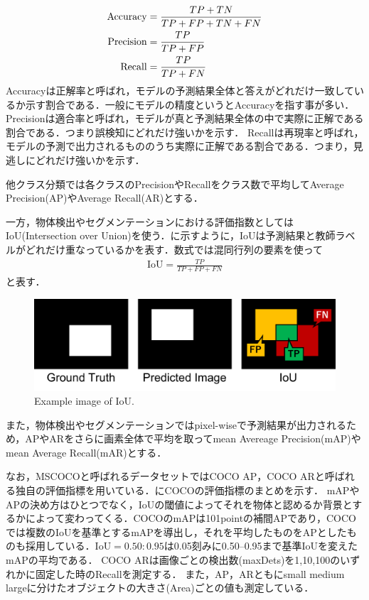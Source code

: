 \begin{align}\label{eq:精度}
    \mathrm{Accuracy} & = \frac{TP+TN}{TP+FP+TN+FN} \notag \\ 
    \mathrm{Precision} & = \frac{TP}{TP+FP} \\
    \mathrm{Recall} & = \frac{TP}{TP+FN} \notag
\end{align}
Accuracyは正解率と呼ばれ，モデルの予測結果全体と答えがどれだけ一致しているか示す割合である．一般にモデルの精度というとAccuracyを指す事が多い．
Precisionは適合率と呼ばれ，モデルが真と予測結果全体の中で実際に正解である割合である．つまり誤検知にどれだけ強いかを示す．
Recallは再現率と呼ばれ，モデルの予測で出力されるもののうち実際に正解である割合である．つまり，見逃しにどれだけ強いかを示す．

他クラス分類では各クラスのPrecisionやRecallをクラス数で平均してAverage Precision(AP)やAverage Recall(AR)とする．

一方，物体検出やセグメンテーションにおける評価指数としてはIoU(Intersection over Union)を使う．に示すように，IoUは予測結果と教師ラベルがどれだけ重なっているかを表す．数式では混同行列の要素を使って
\begin{align}\label{eq:IoU}
    \mathrm{IoU} = \frac{TP}{TP+FP+FN}
\end{align}
と表す．
\begin{figure}[H]
    \centering
    \includegraphics[width=\linewidth]{figure/chapter2/IoU}
    \caption{Example image of IoU.}
    \label{fig:IoU}
\end{figure}

また，物体検出やセグメンテーションではpixel-wiseで予測結果が出力されるため，APやARをさらに画素全体で平均を取ってmean Avereage Precision(mAP)やmean Average Recall(mAR)とする．

なお，MSCOCOと呼ばれるデータセット\cite{COCO}ではCOCO AP，COCO ARと呼ばれる独自の評価指標を用いている．にCOCOの評価指標のまとめを示す．
mAPやAPの決め方はひとつでなく，IoUの閾値によってそれを物体と認めるか背景とするかによって変わってくる．COCOのmAPは101pointの補間APであり，COCOでは複数のIoUを基準とするmAPを導出し，それを平均したものをAPとしたものも採用している．$\mathrm{IoU} = 0.50:0.95$は0.05刻みに0.50--0.95まで基準IoUを変えたmAPの平均である．
COCO ARは画像ごとの検出数(maxDets)を1,10,100のいずれかに固定した時のRecallを測定する．
また，AP，ARともにsmall \/ medium \/ largeに分けたオブジェクトの大きさ(Area)ごとの値も測定している．

